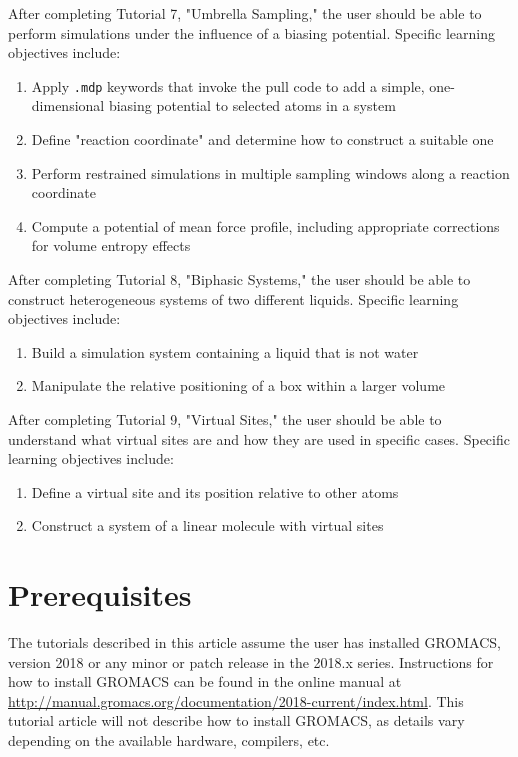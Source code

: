 \documentclass[9pt,tutorial,pubversion]{livecoms}
\begin{document}
After completing Tutorial 7, "Umbrella Sampling," the user should be able to perform simulations under the influence of a biasing potential. Specific learning objectives include:
\begin{enumerate}
	\item Apply \texttt{.mdp} keywords that invoke the pull code to add a simple, one-dimensional biasing potential to selected atoms in a system
	\item Define "reaction coordinate" and determine how to construct a suitable one
	\item Perform restrained simulations in multiple sampling windows along a reaction coordinate
	\item Compute a potential of mean force profile, including appropriate corrections for volume entropy effects
\end{enumerate}

After completing Tutorial 8, "Biphasic Systems," the user should be able to construct heterogeneous systems of two different liquids. Specific learning objectives include:
\begin{enumerate}
	\item Build a simulation system containing a liquid that is not water
	\item Manipulate the relative positioning of a box within a larger volume
\end{enumerate}

After completing Tutorial 9, "Virtual Sites," the user should be able to understand what virtual sites are and how they are used in specific cases. Specific learning objectives include:
\begin{enumerate}
	\item Define a virtual site and its position relative to other atoms
	\item Construct a system of a linear molecule with virtual sites
\end{enumerate}

\section{Prerequisites}


The tutorials described in this article assume the user has installed GROMACS, version 2018 or any minor or patch release in the 2018.x series. Instructions for how to install GROMACS can be found in the online manual at \url{http://manual.gromacs.org/documentation/2018-current/index.html}. This tutorial article will not describe how to install GROMACS, as details vary depending on the available hardware, compilers, etc.
\end{document}
